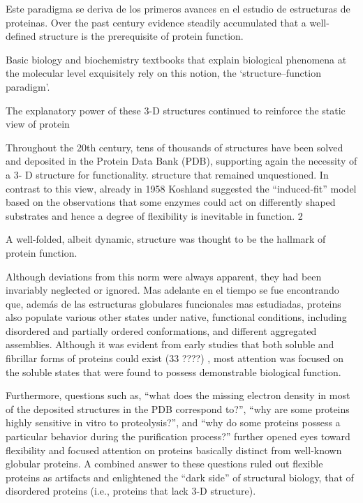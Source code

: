 Este paradigma se deriva de los primeros avances en el estudio de estructuras de proteinas. Over the past century evidence steadily accumulated that a well-defined structure is the prerequisite of protein function.

Basic biology and biochemistry textbooks that explain biological phenomena at the molecular level exquisitely rely on this notion, the ‘structure–function paradigm’.

The explanatory power of these 3-D
structures continued to reinforce the static view of protein

Throughout the 20th century, tens of
thousands of structures have been solved and deposited in the
Protein Data Bank (PDB), supporting again the necessity of a 3-
D structure for functionality.
structure that remained unquestioned.
In contrast to this view,
already in 1958 Koshland suggested the “induced-fit” model
based on the observations that some enzymes could act on
differently shaped substrates and hence a degree of flexibility is
inevitable in function. 2

A well-folded, albeit dynamic,
structure was thought to be the hallmark of protein function.



Although deviations from this norm were always apparent, they had been invariably neglected or ignored.
Mas adelante en el tiempo se fue encontrando que, además de las estructuras globulares funcionales mas estudiadas, proteins also populate various other states under native, functional conditions, including disordered and partially ordered conformations, and different aggregated assemblies.
Although it was evident from early studies that both soluble and fibrillar forms of proteins could exist (33 ????) , most attention was focused on the soluble states that were found to possess demonstrable biological function.


Furthermore, questions such as, “what does the missing
electron density in most of the deposited structures in the PDB
correspond to?”, “why are some proteins highly sensitive in vitro
to proteolysis?”, and “why do some proteins possess a particular
behavior during the purification process?” further opened eyes
toward flexibility and focused attention on proteins basically
distinct from well-known globular proteins. A combined answer
to these questions ruled out flexible proteins as artifacts and
enlightened the “dark side” of structural biology, that of
disordered proteins (i.e., proteins that lack 3-D structure).



